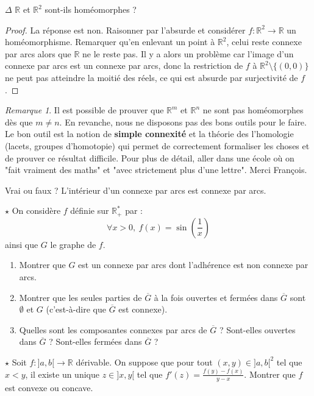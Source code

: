 \documentclass[french,a4paper]{article}
\newcommand{\R}{\mathbb{R}}
\newcommand{\st}{^*}
\theoremstyle{plain}
\theoremstyle{definition}
\theoremstyle{remark}
\newtheorem*{rmq}{Remarque}
\begin{document}
\begin{ex}[Moulin.37]{$\Delta$}
	$\R$ et $\R^2$ sont-ils homéomorphes ?
\end{ex}
\begin{proof}
	La réponse est non. Raisonner par l'absurde et considérer $f:\R^2\to\R$ un homéomorphisme. Remarquer qu'en enlevant un point à $\R^2$, celui reste connexe par arcs alors que $\R$ ne le reste pas. Il y a alors un problème car l'image d'un connexe par arcs est un connexe par arcs, donc la restriction de $f$ à $\R^2\setminus\{(0,0)\}$ ne peut pas atteindre la moitié des réels, ce qui est absurde par surjectivité de $f$.
\end{proof}
\begin{rmq}
	Il est possible de prouver que $\R^m$ et $\R^n$ ne sont pas homéomorphes dès que $m\ne n$. En revanche, nous ne disposons pas des bons outils pour le faire. Le bon outil est la notion de \textbf{simple connexité} et la théorie des l'homologie (lacets, groupes d'homotopie) qui permet de correctement formaliser les choses et de prouver ce résultat difficile. Pour plus de détail, aller dans une école où on "fait vraiment des maths" et "avec strictement plus d'une lettre". Merci François.
\end{rmq}

\begin{ex}[Moulin.38]{}
	Vrai ou faux ? L'intérieur d'un connexe par arcs est connexe par arcs.
\end{ex}

\begin{ex}[Moulin.39]{$\star$}
	On considère $f$ définie sur $\R_+\st$ par : $$\forall x>0,\ f(x)=\sin\left(\frac{1}{x}\right)$$ ainsi que $G$ le graphe de $f$.
	\begin{enumerate}
		\item Montrer que $G$ est un connexe par arcs dont l'adhérence est non connexe par arcs.
		\item Montrer que les seules parties de $\overline{G}$ à la fois ouvertes et fermées dans $\overline{G}$ sont $\emptyset$ et $G$ (c'est-à-dire que $\overline{G}$ est connexe).
		\item Quelles sont les composantes connexes par arcs de $\overline{G}$ ? Sont-elles ouvertes dans $\overline{G}$ ? Sont-elles fermées dans $\overline{G}$ ?
	\end{enumerate}
\end{ex}

\begin{ex}[Moulin.40]{$\star$}
	Soit $f:]a,b[\to\R$ dérivable. On suppose que pour tout $(x,y)\in]a,b[^2$ tel que $x<y$, il existe un unique $z\in]x,y[$ tel que $f'(z)=\displaystyle\frac{f(y)-f(x)}{y-x}$. Montrer que $f$ est convexe ou concave.
\end{ex}
\end{document}
